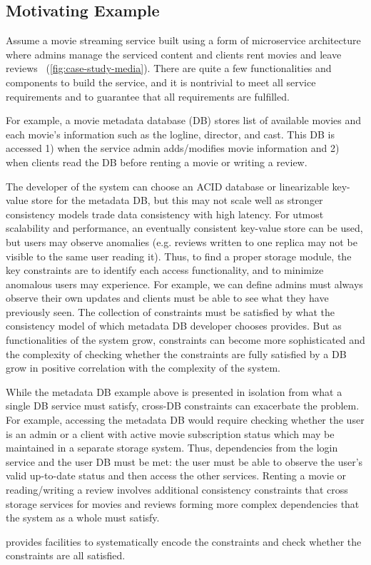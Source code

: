 \subsection{Motivating Example}
\label{subsec:eg}
Assume a movie streaming service built using a form of
microservice architecture where admins manage the serviced
content and clients rent movies and leave reviews~\cite{gan2019an}
(\cref{fig:case-study-media}).
There are quite a few functionalities and components to build the
service, and it is nontrivial to meet all service requirements
and to guarantee that all requirements are fulfilled.

For example, a movie metadata database (DB) stores list of
available movies and each movie's information such as the
logline, director, and cast. This DB is accessed 1) when
the service admin adds/modifies movie information and
2) when clients read the DB before renting a movie
or writing a review.

The developer of the system can choose an ACID database or linearizable
key-value store for the metadata DB, but this may not scale well as
stronger consistency models trade data consistency with high latency.
For utmost scalability and performance, an eventually consistent
key-value store can be used, but users may observe anomalies (e.g. reviews
written to one replica may not be visible to the same user reading it).
Thus, to find a proper storage module, the key constraints are to identify
each access functionality, and to minimize anomalous users may experience.
For example, we can define admins must always observe their own
updates and clients must be able
to see what they have previously seen. The collection of constraints
must be satisfied
by what the consistency model of which metadata DB developer chooses provides.
But as functionalities of the system grow, constraints can become
more sophisticated and
the complexity of checking whether the constraints are fully satisfied by a DB
grow in positive correlation with the complexity of the system.

While the metadata DB example above is presented in isolation from
what a single DB service must satisfy, cross-DB constraints can exacerbate
the problem. For example, accessing the metadata DB would require
checking whether the user is an admin or a client with active movie subscription
status which may be maintained in a separate storage system. Thus,
dependencies from the login service and the user DB must be met:
the user must be able to observe the user's valid up-to-date status
and then access the other services. Renting a movie or reading/writing a
review involves additional consistency constraints that cross storage services
for movies and reviews forming more complex dependencies that the system as a
whole must satisfy.

\sysname{} provides facilities to systematically encode the constraints
and check whether the constraints are all satisfied.
